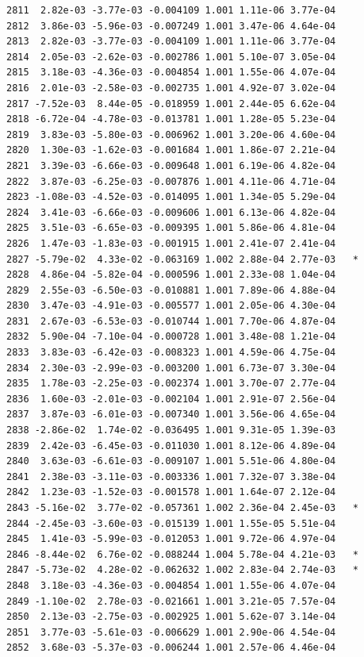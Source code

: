 \documentclass[
  letterpaper,
  DIV=11,
  numbers=noendperiod]{scrartcl}
\begin{document}
\begin{verbatim}
2811  2.82e-03 -3.77e-03 -0.004109 1.001 1.11e-06 3.77e-04    
2812  3.86e-03 -5.96e-03 -0.007249 1.001 3.47e-06 4.64e-04    
2813  2.82e-03 -3.77e-03 -0.004109 1.001 1.11e-06 3.77e-04    
2814  2.05e-03 -2.62e-03 -0.002786 1.001 5.10e-07 3.05e-04    
2815  3.18e-03 -4.36e-03 -0.004854 1.001 1.55e-06 4.07e-04    
2816  2.01e-03 -2.58e-03 -0.002735 1.001 4.92e-07 3.02e-04    
2817 -7.52e-03  8.44e-05 -0.018959 1.001 2.44e-05 6.62e-04    
2818 -6.72e-04 -4.78e-03 -0.013781 1.001 1.28e-05 5.23e-04    
2819  3.83e-03 -5.80e-03 -0.006962 1.001 3.20e-06 4.60e-04    
2820  1.30e-03 -1.62e-03 -0.001684 1.001 1.86e-07 2.21e-04    
2821  3.39e-03 -6.66e-03 -0.009648 1.001 6.19e-06 4.82e-04    
2822  3.87e-03 -6.25e-03 -0.007876 1.001 4.11e-06 4.71e-04    
2823 -1.08e-03 -4.52e-03 -0.014095 1.001 1.34e-05 5.29e-04    
2824  3.41e-03 -6.66e-03 -0.009606 1.001 6.13e-06 4.82e-04    
2825  3.51e-03 -6.65e-03 -0.009395 1.001 5.86e-06 4.81e-04    
2826  1.47e-03 -1.83e-03 -0.001915 1.001 2.41e-07 2.41e-04    
2827 -5.79e-02  4.33e-02 -0.063169 1.002 2.88e-04 2.77e-03   *
2828  4.86e-04 -5.82e-04 -0.000596 1.001 2.33e-08 1.04e-04    
2829  2.55e-03 -6.50e-03 -0.010881 1.001 7.89e-06 4.88e-04    
2830  3.47e-03 -4.91e-03 -0.005577 1.001 2.05e-06 4.30e-04    
2831  2.67e-03 -6.53e-03 -0.010744 1.001 7.70e-06 4.87e-04    
2832  5.90e-04 -7.10e-04 -0.000728 1.001 3.48e-08 1.21e-04    
2833  3.83e-03 -6.42e-03 -0.008323 1.001 4.59e-06 4.75e-04    
2834  2.30e-03 -2.99e-03 -0.003200 1.001 6.73e-07 3.30e-04    
2835  1.78e-03 -2.25e-03 -0.002374 1.001 3.70e-07 2.77e-04    
2836  1.60e-03 -2.01e-03 -0.002104 1.001 2.91e-07 2.56e-04    
2837  3.87e-03 -6.01e-03 -0.007340 1.001 3.56e-06 4.65e-04    
2838 -2.86e-02  1.74e-02 -0.036495 1.001 9.31e-05 1.39e-03    
2839  2.42e-03 -6.45e-03 -0.011030 1.001 8.12e-06 4.89e-04    
2840  3.63e-03 -6.61e-03 -0.009107 1.001 5.51e-06 4.80e-04    
2841  2.38e-03 -3.11e-03 -0.003336 1.001 7.32e-07 3.38e-04    
2842  1.23e-03 -1.52e-03 -0.001578 1.001 1.64e-07 2.12e-04    
2843 -5.16e-02  3.77e-02 -0.057361 1.002 2.36e-04 2.45e-03   *
2844 -2.45e-03 -3.60e-03 -0.015139 1.001 1.55e-05 5.51e-04    
2845  1.41e-03 -5.99e-03 -0.012053 1.001 9.72e-06 4.97e-04    
2846 -8.44e-02  6.76e-02 -0.088244 1.004 5.78e-04 4.21e-03   *
2847 -5.73e-02  4.28e-02 -0.062632 1.002 2.83e-04 2.74e-03   *
2848  3.18e-03 -4.36e-03 -0.004854 1.001 1.55e-06 4.07e-04    
2849 -1.10e-02  2.78e-03 -0.021661 1.001 3.21e-05 7.57e-04    
2850  2.13e-03 -2.75e-03 -0.002925 1.001 5.62e-07 3.14e-04    
2851  3.77e-03 -5.61e-03 -0.006629 1.001 2.90e-06 4.54e-04    
2852  3.68e-03 -5.37e-03 -0.006244 1.001 2.57e-06 4.46e-04    

\end{verbatim}
\end{document}
